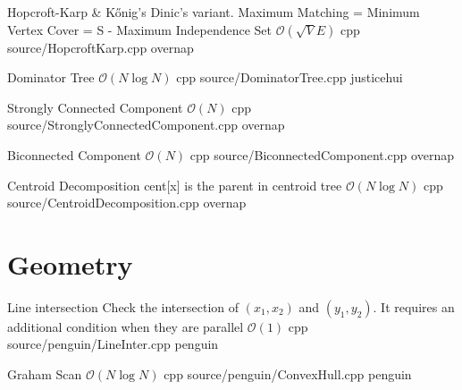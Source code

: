 \documentclass[landscape, 10pt, a4paper, oneside, twocolumn]{extarticle}
\begin{document}

\Algorithm
{Hopcroft-Karp \& Kőnig's}
{Dinic's variant. Maximum Matching = Minimum Vertex Cover = S - Maximum Independence Set}
{$\mathcal{O}(\sqrt{V}E)$}
{cpp}
{source/HopcroftKarp.cpp}
{overnap}




\Algorithm
{Dominator Tree}
{}
{$\mathcal{O}(N\log{N})$}
{cpp}
{source/DominatorTree.cpp}
{justicehui}

\Algorithm
{Strongly Connected Component}
{}
{$\mathcal{O}(N)$}
{cpp}
{source/StronglyConnectedComponent.cpp}
{overnap}

\Algorithm
{Biconnected Component}
{}
{$\mathcal{O}(N)$}
{cpp}
{source/BiconnectedComponent.cpp}
{overnap}



\Algorithm
{Centroid Decomposition}
{cent[x] is the parent in centroid tree}
{$\mathcal{O}(N\log{N})$}
{cpp}
{source/CentroidDecomposition.cpp}
{overnap}


\section{Geometry}

\Algorithm
{Line intersection}
{Check the intersection of $(x_1, x_2)$ and $(y_1, y_2)$. It requires an additional condition when they are parallel}
{$\mathcal{O}(1)$}
{cpp}
{source/penguin/LineInter.cpp}
{penguin}

\Algorithm
{Graham Scan}
{}
{$\mathcal{O}(N\log{N})$}
{cpp}
{source/penguin/ConvexHull.cpp}
{penguin}
\end{document}
